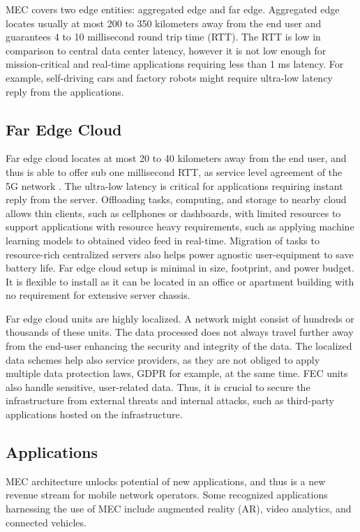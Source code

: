 MEC covers two edge entities: aggregated edge and far edge. Aggregated edge locates usually at most 200 to 350 kilometers away from the end user and guarantees 4 to 10 millisecond round trip time (RTT). The RTT is low in comparison to central data center latency, however it is not low enough for mission-critical and real-time applications requiring less than 1 ms latency. For example, self-driving cars and factory robots might require ultra-low latency reply from the applications.

\subsection{Far Edge Cloud}

Far edge cloud locates at most 20 to 40 kilometers away from the end user, and thus is able to offer sub one millisecond RTT, as service level agreement of the 5G network \cite{Parvez2018}. The ultra-low latency is critical for applications requiring instant reply from the server. Offloading tasks, computing, and storage to nearby cloud allows thin clients, such as cellphones or dashboards, with limited resources to support applications with resource heavy requirements, such as applying machine learning models to obtained video feed in real-time. Migration of tasks to resource-rich centralized servers also helps power agnostic user-equipment to save battery life. Far edge cloud setup is minimal in size, footprint, and power budget. It is flexible to install as it can be located in an office or apartment building with no requirement for extensive server chassis. \cite{AirFrameOpenEdgeServer}

Far edge cloud units are highly localized. A network might consist of hundreds or thousands of these units. The data processed does not always travel further away from the end-user enhancing the security and integrity of the data. The localized data schemes help also service providers, as they are not obliged to apply multiple data protection laws, GDPR for example, at the same time. FEC units also handle sensitive, user-related data. Thus, it is crucial to secure the infrastructure from external threats and internal attacks, such as third-party applications hosted on the infrastructure.

\subsection{Applications}
\label{subs:applications}

MEC architecture unlocks potential of new applications, and thus is a new revenue stream for mobile network operators. Some recognized applications harnessing the use of MEC include augmented reality (AR), video analytics, and connected vehicles.

